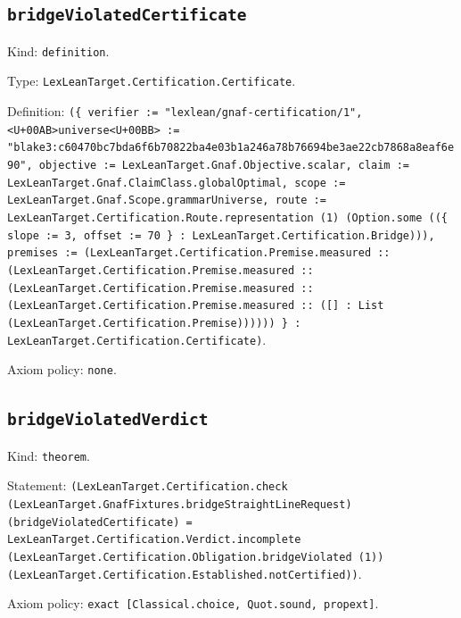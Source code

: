\documentclass[11pt]{article}
\begin{document}
\subsection*{\texttt{bridgeViolatedCertificate}}
\noindent Kind: \texttt{definition}.\par
\noindent Type: \texttt{LexLeanTarget.Certification.Certificate}.\par
\noindent Definition: \texttt{(\{ verifier := "lexlean/gnaf-certification/1", <U+00AB>universe<U+00BB> := "blake3:c60470bc7bda6f6b70822ba4e03b1a246a78b76694be3ae22cb7868a8eaf6e90", objective := LexLeanTarget.Gnaf.Objective.scalar, claim := LexLeanTarget.Gnaf.ClaimClass.globalOptimal, scope := LexLeanTarget.Gnaf.Scope.grammarUniverse, route := LexLeanTarget.Certification.Route.representation (1) (Option.some ((\{ slope := 3, offset := 70 \} : LexLeanTarget.Certification.Bridge))), premises := (LexLeanTarget.Certification.Premise.measured :: (LexLeanTarget.Certification.Premise.measured :: (LexLeanTarget.Certification.Premise.measured :: (LexLeanTarget.Certification.Premise.measured :: ([] : List (LexLeanTarget.Certification.Premise)))))) \} : LexLeanTarget.Certification.Certificate)}.\par
\noindent Axiom policy: \texttt{none}.\par
\subsection*{\texttt{bridgeViolatedVerdict}}
\noindent Kind: \texttt{theorem}.\par
\noindent Statement: \texttt{(LexLeanTarget.Certification.check (LexLeanTarget.GnafFixtures.bridgeStraightLineRequest) (bridgeViolatedCertificate) = LexLeanTarget.Certification.Verdict.incomplete (LexLeanTarget.Certification.Obligation.bridgeViolated (1)) (LexLeanTarget.Certification.Established.notCertified))}.\par
\noindent Axiom policy: \texttt{exact [Classical.choice, Quot.sound, propext]}.\par
\end{document}
